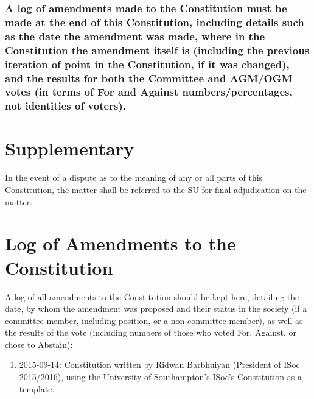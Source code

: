 \documentclass[12pt]{article}
\begin{document}
\subsubsection{A log of amendments made to the Constitution must be made at the end of this Constitution, including details such as the date the amendment was made, where in the Constitution the amendment itself is (including the previous iteration of point in the Constitution, if it was changed), and the results for both the Committee and AGM/OGM votes (in terms of For and Against numbers/percentages, not identities of voters).}

\section*{Supplementary}
In the event of a dispute as to the meaning of any or all parts of this Constitution, the matter shall be referred to the SU for final adjudication on the matter.

\section*{Log of Amendments to the Constitution}
A log of all amendments to the Constitution should be kept here, detailing the date, by whom the amendment was proposed and their status in the society (if a committee member, including position, or a non-committee member), as well as the results of the vote (including numbers of those who voted For, Against, or chose to Abstain):

\begin{displayquote}
\begin{enumerate}[1.]
\item 2015-09-14:	Constitution written by Ridwan Barbhuiyan (President of ISoc 2015/2016), using the University of Southampton's ISoc's Constitution as a template.
\end{enumerate}
\end{displayquote}
\end{document}

